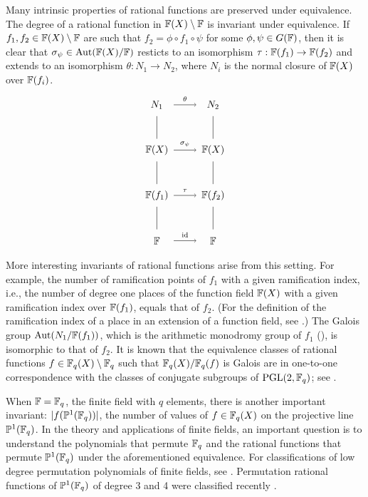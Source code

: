 \documentclass{amsart}
\numberwithin{equation}{section}
\theoremstyle{definition}
\newcommand{\f}{\Bbb F}
\begin{document}
Many intrinsic properties of rational functions are preserved under equivalence. The degree of a rational function in $\f(X)\setminus\f$ is invariant under equivalence. If $f_1,f_2\in\f(X)\setminus\f$ are such that $f_2=\phi\circ f_1\circ\psi$ for some $\phi,\psi\in G(\f)$, then it is clear that $\sigma_\psi\in\text{Aut}(\f(X)/\f)$ resticts to an isomorphism $\tau:\f(f_1)\to\f(f_2)$ and extends to an isomorphism $\theta:N_1\to N_2$, where $N_i$ is the normal closure of $\f(X)$ over $\f(f_i)$.
\[
\begin{tikzpicture}[xscale=1, yscale=0.8]

\node at (0,0) {$\f$};
\node at (2,0) {$\f$};
\node at (0,2) {$\f(f_1)$};
\node at (2,2) {$\f(f_2)$};
\node at (0,4) {$\f(X)$};
\node at (2,4) {$\f(X)$};
\node at (0,6) {$N_1$};
\node at (2,6) {$N_2$};

\draw (0,0.5) -- (0,1.5);
\draw (2,0.5) -- (2,1.5);
\draw (0,2.5) -- (0,3.5);
\draw (2,2.5) -- (2,3.5);
\draw (0,4.5) -- (0,5.5);
\draw (2,4.5) -- (2,5.5);

\draw[->] (0.6,0) to (1.4,0);
\draw[->] (0.6,2) to (1.4,2);
\draw[->] (0.6,4) to (1.4,4);
\draw[->] (0.6,6) to (1.4,6);

\node [above] at (1,0) {$\scriptstyle \text{id}$};
\node [above] at (1,2) {$\scriptstyle \tau$};
\node [above] at (1,4) {$\scriptstyle \sigma_\psi$};
\node [above] at (1,6) {$\scriptstyle \theta$};

\end{tikzpicture}
\]
More interesting invariants of rational functions arise from this setting. For example, the number of ramification points of $f_1$ with a given ramification index, i.e., the number of degree one places of the function field $\f(X)$ with a given ramification index over $\f(f_1)$, equals that of $f_2$. (For the definition of the ramification index of a place in an extension of a function field, see \cite[III.1]{Stichtenoth-1993}.) The Galois group $\text{Aut}(N_1/\f(f_1))$, which is the arithmetic monodromy group of $f_1$ (\cite{Cohen-Matthews-TAMS-1994}), is isomorphic to that of $f_2$.
It is known that the equivalence classes of rational functions $f\in\f_q(X)\setminus\f_q$ such that $\f_q(X)/\f_q(f)$ is Galois are in one-to-one correspondence with the classes of conjugate subgroups of $\text{PGL}(2,\f_q)$; see \cite{Hou-CA-2020}.

When $\f=\f_q$, the finite field with $q$ elements, there is another important invariant: $|f(\Bbb P^1(\f_q))|$, the number of values of $f\in\f_q(X)$ on the projective line $\Bbb P^1(\f_q)$. In the theory and applications of finite fields, an important question is to understand the polynomials that permute $\f_q$ and the rational functions that permute $\Bbb P^1(\f_q)$ under the aforementioned equivalence. For classifications of low degree permutation polynomials of finite fields, see \cite{Dickson-AM-1896, Fan-arXiv1812.02080, Fan-arXiv1903.10309, Li-Chandler-Xiang-FFA-2010, Shallue-Wanless-FFA-2013}. Permutation rational functions of $\Bbb P^1(\f_q)$ of degree 3 and 4 were classified recently \cite{Ding-Zieve-arXiv2010.15657, Ferraguti-Micheli-DCC-2020, Hou-CA-2021}. 
\end{document}
